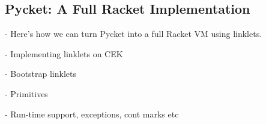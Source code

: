 
\subsection{Pycket: A Full Racket Implementation}
\label{subsec:pycket}

- Here's how we can turn Pycket into a full Racket VM using linklets.

- Implementing linklets on CEK

- Bootstrap linklets

- Primitives

- Run-time support, exceptions, cont marks etc
